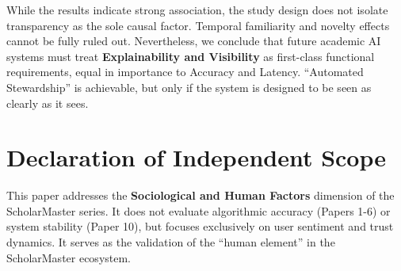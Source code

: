 \documentclass[conference]{IEEEtran}
\begin{document}
While the results indicate strong association, the study design does not isolate transparency as the sole causal factor. Temporal familiarity and novelty effects cannot be fully ruled out. Nevertheless, we conclude that future academic AI systems must treat \textbf{Explainability and Visibility} as first-class functional requirements, equal in importance to Accuracy and Latency. ``Automated Stewardship'' is achievable, but only if the system is designed to be seen as clearly as it sees.

\section*{Declaration of Independent Scope}
This paper addresses the \textbf{Sociological and Human Factors} dimension of the ScholarMaster series. It does not evaluate algorithmic accuracy (Papers 1-6) or system stability (Paper 10), but focuses exclusively on user sentiment and trust dynamics. It serves as the validation of the ``human element'' in the ScholarMaster ecosystem.
\end{document}
